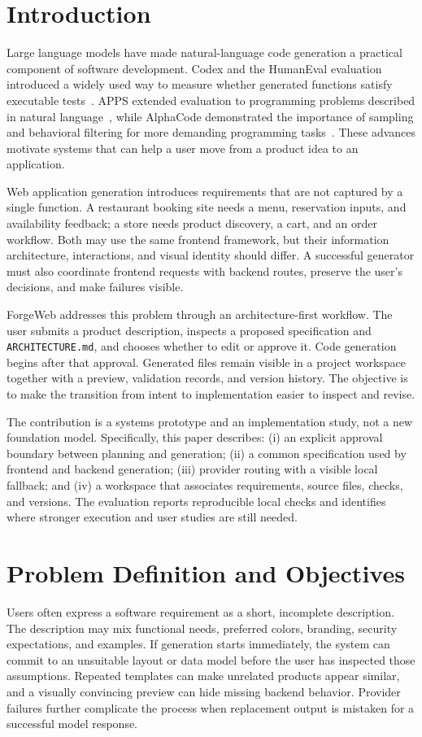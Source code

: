 \documentclass[conference,a4paper]{IEEEtran}
\begin{document}
\section{Introduction}
Large language models have made natural-language code generation a practical component of software development. Codex and the HumanEval evaluation introduced a widely used way to measure whether generated functions satisfy executable tests~\cite{chen2021codex}. APPS extended evaluation to programming problems described in natural language~\cite{hendrycks2021apps}, while AlphaCode demonstrated the importance of sampling and behavioral filtering for more demanding programming tasks~\cite{li2022alphacode}. These advances motivate systems that can help a user move from a product idea to an application.

Web application generation introduces requirements that are not captured by a single function. A restaurant booking site needs a menu, reservation inputs, and availability feedback; a store needs product discovery, a cart, and an order workflow. Both may use the same frontend framework, but their information architecture, interactions, and visual identity should differ. A successful generator must also coordinate frontend requests with backend routes, preserve the user's decisions, and make failures visible.

ForgeWeb addresses this problem through an architecture-first workflow. The user submits a product description, inspects a proposed specification and \texttt{ARCHITECTURE.md}, and chooses whether to edit or approve it. Code generation begins after that approval. Generated files remain visible in a project workspace together with a preview, validation records, and version history. The objective is to make the transition from intent to implementation easier to inspect and revise.

The contribution is a systems prototype and an implementation study, not a new foundation model. Specifically, this paper describes: (i) an explicit approval boundary between planning and generation; (ii) a common specification used by frontend and backend generation; (iii) provider routing with a visible local fallback; and (iv) a workspace that associates requirements, source files, checks, and versions. The evaluation reports reproducible local checks and identifies where stronger execution and user studies are still needed.

\section{Problem Definition and Objectives}
Users often express a software requirement as a short, incomplete description. The description may mix functional needs, preferred colors, branding, security expectations, and examples. If generation starts immediately, the system can commit to an unsuitable layout or data model before the user has inspected those assumptions. Repeated templates can make unrelated products appear similar, and a visually convincing preview can hide missing backend behavior. Provider failures further complicate the process when replacement output is mistaken for a successful model response.
\end{document}
